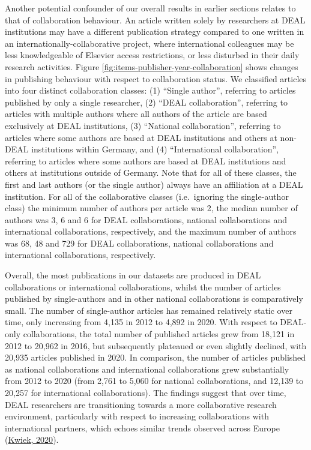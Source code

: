 \documentclass[
]{article}
\begin{document}
Another potential confounder of our overall results in earlier sections relates to that of collaboration behaviour. An article written solely by researchers at DEAL institutions may have a different publication strategy compared to one written in an internationally-collaborative project, where international colleagues may be less knowledgeable of Elsevier access restrictions, or less disturbed in their daily research activities. Figure \ref{fig:items-publisher-year-collaboration} shows changes in publishing behaviour with respect to collaboration status. We classified articles into four distinct collaboration classes: (1) ``Single author'', referring to articles published by only a single researcher, (2) ``DEAL collaboration'', referring to articles with multiple authors where all authors of the article are based exclusively at DEAL institutions, (3) ``National collaboration'', referring to articles where some authors are based at DEAL institutions and others at non-DEAL institutions within Germany, and (4) ``International collaboration'', referring to articles where some authors are based at DEAL institutions and others at institutions outside of Germany. Note that for all of these classes, the first and last authors (or the single author) always have an affiliation at a DEAL institution. For all of the collaborative classes (i.e.~ignoring the single-author class) the minimum number of authors per article was 2, the median number of authors was 3, 6 and 6 for DEAL collaborations, national collaborations and international collaborations, respectively, and the maximum number of authors was 68, 48 and 729 for DEAL collaborations, national collaborations and international collaborations, respectively.

Overall, the most publications in our datasets are produced in DEAL collaborations or international collaborations, whilst the number of articles published by single-authors and in other national collaborations is comparatively small. The number of single-author articles has remained relatively static over time, only increasing from 4,135 in 2012 to 4,892 in 2020. With respect to DEAL-only collaborations, the total number of published articles grew from 18,121 in 2012 to 20,962 in 2016, but subsequently plateaued or even slightly declined, with 20,935 articles published in 2020. In comparison, the number of articles published as national collaborations and international collaborations grew substantially from 2012 to 2020 (from 2,761 to 5,060 for national collaborations, and 12,139 to 20,257 for international collaborations). The findings suggest that over time, DEAL researchers are transitioning towards a more collaborative research environment, particularly with respect to increasing collaborations with international partners, which echoes similar trends observed across Europe (\href{https://doi.org/10.1080/03075079.2020.1749254}{Kwiek, 2020}).
\end{document}
